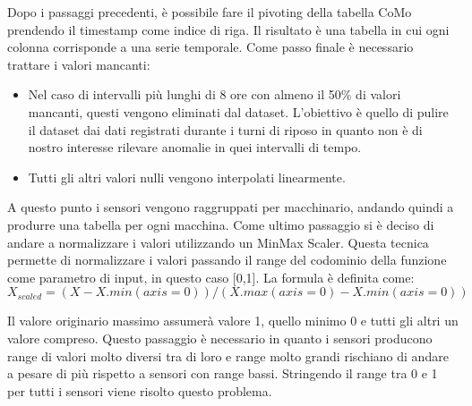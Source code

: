 Dopo i passaggi precedenti, è possibile fare il pivoting della tabella CoMo  prendendo il timestamp come indice di riga. Il risultato è una tabella in cui ogni colonna corrisponde a una serie temporale. 
Come passo finale è necessario trattare i valori mancanti:
\begin{itemize}
	\item Nel caso di intervalli più lunghi di 8 ore con almeno il 50\% di valori mancanti, questi vengono eliminati dal dataset. L'obiettivo è quello di pulire il dataset dai dati registrati durante i turni di riposo in quanto non è di nostro interesse rilevare anomalie in quei intervalli di tempo.
	\item Tutti gli altri valori nulli vengono interpolati linearmente.
\end{itemize}
A questo punto i sensori vengono raggruppati per macchinario, andando quindi a produrre una tabella per ogni macchina.
Come ultimo passaggio si è deciso di andare a normalizzare i valori utilizzando un MinMax Scaler. Questa tecnica permette di normalizzare i valori passando il range del codominio della funzione come parametro di input, in questo caso [0,1]. La formula è definita come:
\[X_{scaled} = (X - X.min(axis=0)) / (X.max(axis=0) - X.min(axis=0))\]

Il valore originario massimo assumerà valore 1, quello minimo 0 e tutti gli altri un valore compreso.
Questo passaggio è necessario in quanto i sensori producono range di valori molto diversi tra di loro e range molto grandi rischiano di andare a pesare di più rispetto a sensori con range bassi. Stringendo il range tra 0 e 1 per tutti i sensori viene risolto questo problema.